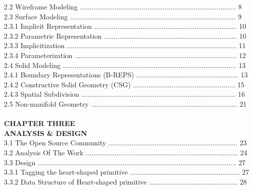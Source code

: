 \documentclass[11pt, oneside]{Thesis} %
\begin{document}
2.2 Wireframe Modeling ................................................................................. 8\\
2.3 Surface Modeling ...................................................................................... 9\\
2.3.1 Implicit Representation .......................................................................... 10\\
2.3.2 Parametric Representation ..................................................................... 10\\
2.3.3 Implicitization ........................................................................................ 11\\
2.3.4 Parameterization .................................................................................... 12\\
2.4 Solid Modeling .......................................................................................... 13\\
2.4.1 Boundary Representations (B-REPS) ..................................................... 13\\
2.4.2 Constructive Solid Geometry (CSG) ..................................................... 15\\
2.4.3 Spatial Subdivision ................................................................................ 16\\
2.5 Non-manifold Geometry ............................................................................ 21\\\\
\hspace*{150}			\textbf{CHAPTER THREE}\\
\hspace*{140}		\textbf{ANALYSIS \& DESIGN}\\
3.1 The Open Source Community ................................................................... 23\\
3.2 Analysis Of The Work ............................................................................... 24\\
3.3 Design ....................................................................................................... 27\\
3.3.1 Tagging the heart-shaped primitive ......................................................... 27\\
3.3.2 Data Structure of Heart-shaped primitive .............................................. 28\\
\end{document}
